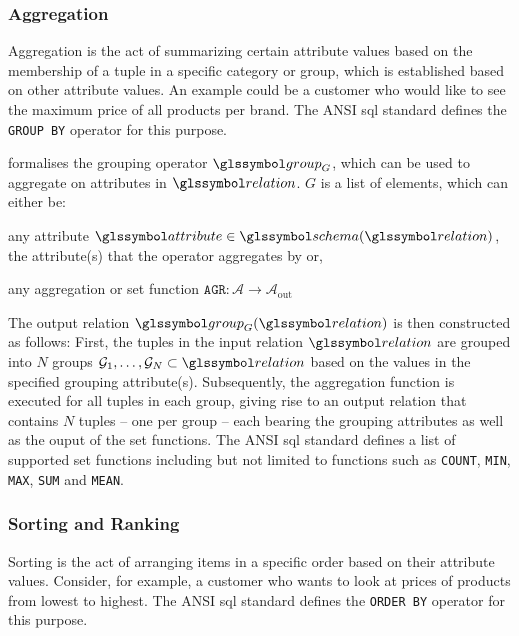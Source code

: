\subsubsection{Aggregation}

Aggregation is the act of summarizing certain attribute values based on the membership of a tuple in a specific category or group, which is established based on other attribute values. An example could be a customer who would like to see the maximum price of all products per brand. The ANSI \acrshort{sql} standard \cite{XOpen:1996SQL} defines the \texttt{GROUP BY} operator for this purpose.

\cite{Garcia:2009Database} formalises the grouping operator $\group_{G}$, which can be used to aggregate on attributes in $\relation$. $G$ is a list of elements, which can either be:
\begin{enumerate*}[label=(\roman*)]
    \item any attribute $\attribute \in \schema(\relation)$, the attribute(s) that the operator aggregates by or,
    \item any aggregation or set function $\texttt{AGR} \colon \mathcal{A} \rightarrow \mathcal{A}_{\text{out}}$
\end{enumerate*}

The output relation $\group_G (\relation)$ is then constructed as follows: First, the tuples in the input relation  $\relation$ are grouped into $N$ groups $\mathcal{G}_1, \ldots,\mathcal{G}_N \subset \relation$ based on the values in the specified grouping attribute(s). Subsequently, the aggregation function is executed for all tuples in each group, giving rise to an output relation that contains $N$ tuples --  one per group -- each bearing the grouping attributes as well as the ouput of the set functions. The ANSI \acrshort{sql} standard \cite{XOpen:1996SQL} defines a list of supported set functions including but not limited to functions such as \texttt{COUNT}, \texttt{MIN}, \texttt{MAX}, \texttt{SUM} and \texttt{MEAN}.

\subsubsection{Sorting and Ranking}

Sorting is the act of arranging items in a specific order based on their attribute values. Consider, for example, a customer who wants to look at prices of products from lowest to highest. The ANSI \acrshort{sql} standard \cite{XOpen:1996SQL} defines the \texttt{ORDER BY} operator for this purpose.

